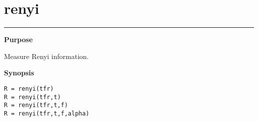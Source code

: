 

\section*{\hspace*{-1.6cm} renyi}

\vspace*{-.4cm}
\hspace*{-1.6cm}\rule[0in]{16.5cm}{.02cm}
\vspace*{.2cm}



{\bf \large \sf Purpose}\\
\hspace*{1.5cm}
\begin{minipage}[t]{13.5cm}
Measure Renyi information.
\end{minipage}
\vspace*{.5cm}


{\bf \large \sf Synopsis}\\
\hspace*{1.5cm}
\begin{minipage}[t]{13.5cm}
\begin{verbatim}
R = renyi(tfr)
R = renyi(tfr,t)
R = renyi(tfr,t,f)
R = renyi(tfr,t,f,alpha)
\end{verbatim}
\end{minipage}
\vspace*{.5cm}


